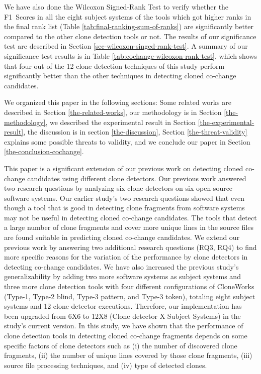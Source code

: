 \documentclass[review]{elsarticle}
\begin{document}
We have also done the Wilcoxon Signed-Rank Test \cite{wilcoxon-signed-rank-test, wilcoxon-signed-rank-test-rosner} to verify whether the F1~Scores in all the eight subject systems of the tools which got higher ranks in the final rank list (Table \ref{tab:final-ranking-sum-of-ranks}) are significantly better compared to the other clone detection tools or not. The results of our significance test are described in Section \ref{sec-wilcoxon-singed-rank-test}. A summary of our significance test results is in Table \ref{tab:cochange-wilcoxon-rank-test}, which shows that four out of the 12 clone detection techniques of this study perform significantly better than the other techniques in detecting cloned co-change candidates.

We organized this paper in the following sections: Some related works are described in Section \ref{the-related-works}, our methodology is in Section \ref{the-methodology}, we described the experimental result in Section \ref{the-experimental-result}, the discussion is in section \ref{the-discussion}, Section \ref{the-threat-validity} explains some possible threats to validity, and we conclude our paper in Section \ref{the-conclusion-cochange}.

This paper is a significant extension of our previous work \cite{nadim-iwsc-2020} on detecting cloned co-change candidates using different clone detectors. Our previous work answered two research questions by analyzing six clone detectors on six open-source software systems. Our earlier study's two research questions showed that even though a tool that is good in detecting clone fragments from software systems may not be useful in detecting cloned co-change candidates. The tools that detect a large number of clone fragments and cover more unique lines in the source files are found suitable in predicting cloned co-change candidates. We extend our previous work by answering two additional research questions (RQ3, RQ4) to find more specific reasons for the variation of the performance by clone detectors in detecting co-change candidates. We have also increased the previous study's generalizability by adding two more software systems as subject systems and three more clone detection tools with four different configurations of CloneWorks (Type-1, Type-2 blind, Type-3 pattern, and Type-3 token), totaling eight subject systems and 12 clone detector executions. Therefore, our implementation has been upgraded from 6X6 to 12X8 (Clone detector X Subject Systems) in the study's current version. In this study, we have shown that the performance of clone detection tools in detecting cloned co-change fragments depends on some specific factors of clone detectors such as (i) the number of discovered clone fragments, (ii) the number of unique lines covered by those clone fragments, (iii) source file processing techniques, and (iv) type of detected clones. 
\end{document}
